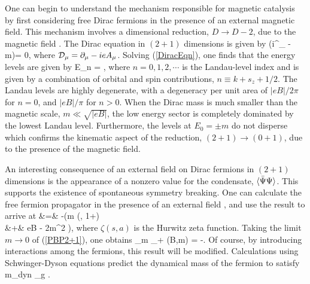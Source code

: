 \documentclass[aps,prd,twocolumn,showpacs,superscriptaddress,groupedaddress]{revtex4}  %
\begin{document}
One can begin to understand the mechanism responsible for magnetic catalysis by first considering free Dirac fermions in the presence of an external magnetic field. This mechanism involves a dimensional 
reduction, $D \to D-2$, due to the magnetic field \cite{Shovkovy}. The Dirac equation in $(2+1)$ dimensions is given by 
\beq
\label{DiracEqn}
(i\gamma^{\mu}\D_{\mu} - m)\Psi = 0,
\eeq
where ${\cal D}_{\mu} = \partial_{\mu} - ieA_{\mu}$.
Solving (\ref{DiracEqn}), one finds that the energy levels are given by 
\beq
\label{DiracEnergyLevels}
E_n = \pm {},
\eeq
where $n=0,1,2,\cdots$ is the Landau-level index and is given by a combination of orbital and spin contributions, $n \equiv k + s_z + 1/2$. The Landau levels 
are highly degenerate, with a degeneracy per unit area of $|eB|/2\pi$ for $n=0$, and $|eB|/\pi$ for $n>0$. When the Dirac mass is much smaller than the magnetic scale, $m \ll \sqrt{|eB|}$, the low energy sector 
is completely dominated by the lowest Landau level. Furthermore, the levels at $E_0 = \pm m$ do not disperse which confirms the kinematic aspect of the reduction, $(2+1) \to (0+1)$, due to the presence of the magnetic field.

An interesting consequence of an external field on Dirac fermions in $(2+1)$ dimensions is the appearance of a nonzero value for the condensate, ${\langle {\bar \Psi} \Psi \rangle}$. This supports the existence of spontaneous symmetry breaking.
One can calculate the free fermion propagator in the presence of an external field \cite{Schwinger}, and use the result to arrive at \cite{DittrichGies, DittrichReuter}
\beq
\label{PBP2+1} \nn
\vev{\Bpsi \Psi} &=& -\biggl(m  \zeta \left(, 1+\right) \\ &+& eB - 2m^2 \biggr),
\eeq
where $\zeta(s,a)$ is the Hurwitz zeta function. Taking the limit $m \to 0$ of (\ref{PBP2+1}), one obtains
\beq
\label{PBP2+1Final}
\lim_{m _+} \vev{\Bpsi \Psi}(B,m) = -.
\eeq
Of course, by introducing interactions among the fermions, this result will be modified. Calculations using Schwinger-Dyson equations predict the dynamical mass of the fermion to satisfy \cite{Shovkovy}
\beq
\label{DynamicalMass}
m_{\rm dyn} \propto \alpha_g .
\eeq

\end{document}
